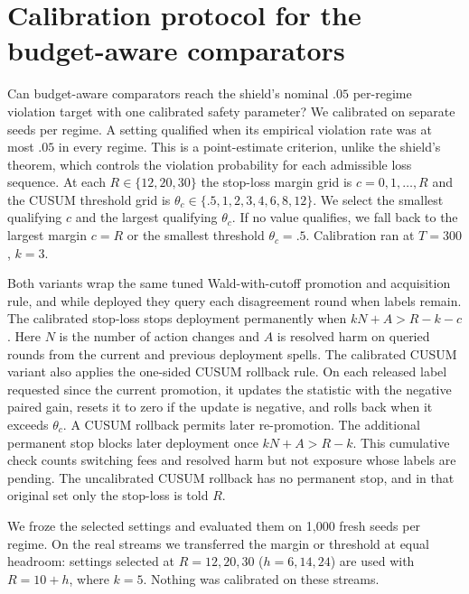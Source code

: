 \documentclass[10pt]{article}
\theoremstyle{plain}
\theoremstyle{definition}
\begin{document}
\section{Calibration protocol for the budget-aware comparators}\label{app:calibproto}
Can budget-aware comparators reach the shield's nominal $.05$ per-regime violation target with one calibrated safety parameter? We calibrated on \CalNSeeds{} separate seeds per regime. A setting qualified when its empirical violation rate was at most $.05$ in every regime. This is a point-estimate criterion, unlike the shield's theorem, which controls the violation probability for each admissible loss sequence. At each $R\in\{12,20,30\}$ the stop-loss margin grid is $c=0,1,\ldots,R$ and the CUSUM threshold grid is $\theta_c\in\{.5,1,2,3,4,6,8,12\}$. We select the smallest qualifying $c$ and the largest qualifying $\theta_c$. If no value qualifies, we fall back to the largest margin $c=R$ or the smallest threshold $\theta_c=.5$. Calibration ran at $T=300$, $k=3$.

Both variants wrap the same tuned Wald-with-cutoff promotion and acquisition rule, and while deployed they query each disagreement round when labels remain. The calibrated stop-loss stops deployment permanently when $kN+A>R-k-c$. Here $N$ is the number of action changes and $A$ is resolved harm on queried rounds from the current and previous deployment spells. The calibrated CUSUM variant also applies the one-sided CUSUM rollback rule. On each released label requested since the current promotion, it updates the statistic with the negative paired gain, resets it to zero if the update is negative, and rolls back when it exceeds $\theta_c$. A CUSUM rollback permits later re-promotion. The additional permanent stop blocks later deployment once $kN+A>R-k$. This cumulative check counts switching fees and resolved harm but not exposure whose labels are pending. The uncalibrated CUSUM rollback has no permanent stop, and in that original set only the stop-loss is told $R$.

We froze the selected settings and evaluated them on 1{,}000 fresh seeds per regime. On the real streams we transferred the margin or threshold at equal headroom: settings selected at $R=12,20,30$ ($h=6,14,24$) are used with $R=10+h$, where $k=5$. Nothing was calibrated on these streams.
\end{document}
